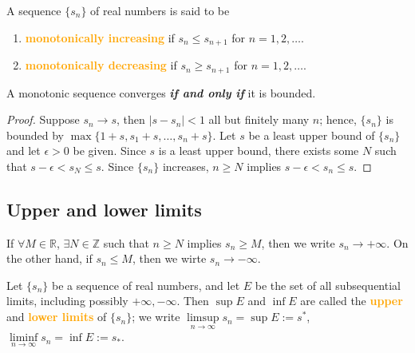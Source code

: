\begin{definition}
A sequence $\{s_n\}$ of real numbers is said to be
\begin{enumerate}[label={(\alph*)}]
\item \textbf{\textcolor{orange}{monotonically increasing}} if $s_n\leq s_{n+1}$ for $n=1,2,\dots$.
\item \textbf{\textcolor{orange}{monotonically decreasing}} if $s_n\geq s_{n+1}$ for $n=1,2,\dots$.
\end{enumerate}
\end{definition}


\begin{theorem}
A monotonic sequence converges \textbf{\emph{if and only if}} it is bounded.
\end{theorem}
\begin{proof}
\forward Suppose $s_n\to s$, then $|s - s_n| < 1$ all but finitely many $n$; hence, $\{s_n\}$ is bounded by $\max \{1+s,s_1+s,\dots,s_n+s\}$.
\backward Let $s$ be a least upper bound of $\{s_n\}$ and let $\epsilon>0$ be given. Since $s$ is a least upper bound, there exists some $N$ such that $s-\epsilon < s_N \leq s$. Since $\{s_n\}$ increases, $n\geq N$ implies $s-\epsilon<s_n\leq s$.
\end{proof}

\subsection{Upper and lower limits}
\begin{definition}
If $\forall M\in \mathbb{R}$, $\exists N\in \mathbb{Z}$ such that $n\geq N$ implies $s_n\geq M$, then we write $s_n\to +\infty$. On the other hand, if $s_n\leq M$, then we wirte $s_n\to -\infty$.
\end{definition}

\begin{definition}
Let $\{s_n\}$ be a sequence of real numbers, and let $E$ be the set of all subsequential limits, including possibly $+\infty, -\infty$. Then $\sup E$ and $\inf E$ are called the \textbf{\textcolor{orange}{upper}} and \textbf{\textcolor{orange}{lower limits}} of $\{s_n\}$; we write $\limsup\limits_{n\to \infty}s_n=\sup E:=s^*$, $\liminf\limits_{n\to \infty}s_n=\inf E:=s_*$.
\end{definition}

